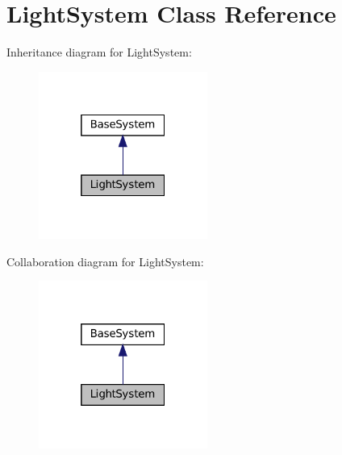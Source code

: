 \hypertarget{classLightSystem}{}\section{Light\+System Class Reference}
\label{classLightSystem}


Inheritance diagram for Light\+System\+:\nopagebreak
\begin{figure}[H]
\begin{center}
\leavevmode
\includegraphics[width=157pt]{classLightSystem__inherit__graph}
\end{center}
\end{figure}


Collaboration diagram for Light\+System\+:\nopagebreak
\begin{figure}[H]
\begin{center}
\leavevmode
\includegraphics[width=157pt]{classLightSystem__coll__graph}
\end{center}
\end{figure}
